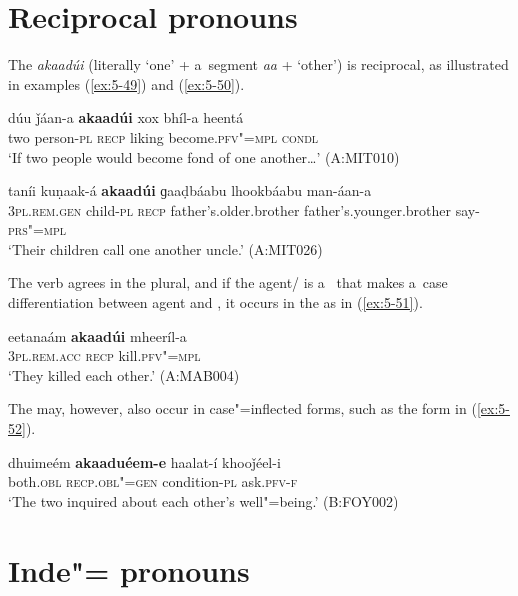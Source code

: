 \section{Reciprocal pronouns}
\label{sec:5-6}

The  \textit{akaadúi} (literally `one' + a~segment \textit{aa} + `other') is reciprocal,
as illustrated in examples (\ref{ex:5-49}) and (\ref{ex:5-50}).

\ea 
\label{ex:5-49}
\gll dúu ǰáan-a \textbf{akaadúi} xox bhíl-a heentá\\
two person-\textsc{pl} \textsc{recp} liking become.\textsc{pfv"=mpl} \textsc{condl}\\
\glt `If two people would become fond of one another{\ldots}' (A:MIT010)

\ex
\label{ex:5-50}
\gll taníi kuṇaak-á \textbf{akaadúi} ɡaaḍbáabu lhookbáabu man-áan-a\\
\textsc{3pl.rem.gen} child-\textsc{pl} \textsc{recp} father's.older.brother father's.younger.brother say-\textsc{prs"=mpl} \\
\glt `Their children call one another uncle.' (A:MIT026)
\z

The  verb agrees in the plural, and if the agent/ is a~ that makes a~case differentiation between agent and , it occurs in the  as in (\ref{ex:5-51}).
\begin{exe}
\ex
\label{ex:5-51}
\gll eetanaám \textbf{akaadúi} mheeríl-a\\
\textsc{3pl.rem.acc} \textsc{recp } kill.\textsc{pfv"=mpl}\\
\glt `They killed each other.' (A:MAB004)
\end{exe}

The  may, however, also occur in case"=inflected forms, such as the  form in (\ref{ex:5-52}). 
\begin{exe}
\ex
\label{ex:5-52}
\gll dhuimeém \textbf{akaaduéem-e} haalat-í khooǰéel-i\\
both.\textsc{obl} \textsc{recp.obl"=gen } condition-\textsc{pl} ask.\textsc{pfv-f}\\
\glt `The two inquired about each other's well"=being.' (B:FOY002)
\end{exe}

\section{Inde"= pronouns}
\label{sec:5-7}


